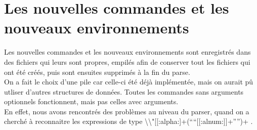 \documentclass[10pt,a4paper]{report}
\begin{document}
\section{Les nouvelles commandes et les nouveaux environnements}

Les nouvelles commandes et les nouveaux environnements sont enregistrés dans des fichiers qui leurs sont propres, empilés afin de conserver tout les fichiers qui ont été créés, puis sont ensuites supprimés à la fin du parse.\\On a fait le choix d'une pile car celle-ci été déjà implémentée, mais on aurait pû utliser d'autres structures de données.
Toutes les commandes sans arguments optionnels fonctionnent, mais pas celles avec arguments.\\En effet, nous avons rencontrés des problèmes au niveau du parser, quand on a cherché à reconnaitre les expressions de type  \textbackslash\textbackslash"[[:alpha:]+(``{``[[:alnum:]]+''}'')+ .
\end{document}
